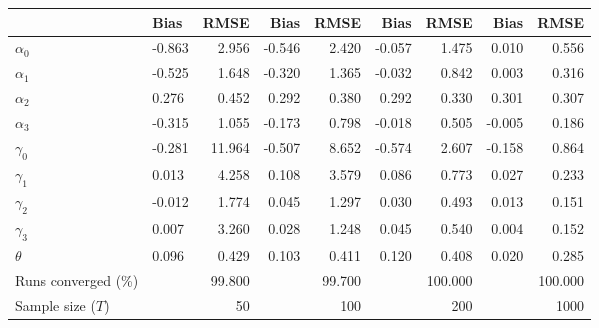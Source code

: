 
\begin{tabular}[t]{llrrrrrrr}
\toprule
  & Bias & RMSE & Bias & RMSE & Bias & RMSE & Bias & RMSE\\
\midrule
$\alpha_{0}$ & -0.863 & 2.956 & -0.546 & 2.420 & -0.057 & 1.475 & 0.010 & 0.556\\
$\alpha_{1}$ & -0.525 & 1.648 & -0.320 & 1.365 & -0.032 & 0.842 & 0.003 & 0.316\\
$\alpha_{2}$ & 0.276 & 0.452 & 0.292 & 0.380 & 0.292 & 0.330 & 0.301 & 0.307\\
$\alpha_{3}$ & -0.315 & 1.055 & -0.173 & 0.798 & -0.018 & 0.505 & -0.005 & 0.186\\
$\gamma_{0}$ & -0.281 & 11.964 & -0.507 & 8.652 & -0.574 & 2.607 & -0.158 & 0.864\\
$\gamma_{1}$ & 0.013 & 4.258 & 0.108 & 3.579 & 0.086 & 0.773 & 0.027 & 0.233\\
$\gamma_{2}$ & -0.012 & 1.774 & 0.045 & 1.297 & 0.030 & 0.493 & 0.013 & 0.151\\
$\gamma_{3}$ & 0.007 & 3.260 & 0.028 & 1.248 & 0.045 & 0.540 & 0.004 & 0.152\\
$\theta$ & 0.096 & 0.429 & 0.103 & 0.411 & 0.120 & 0.408 & 0.020 & 0.285\\
Runs converged (\%) &  & 99.800 &  & 99.700 &  & 100.000 &  & 100.000\\
Sample size ($T$) &  & 50 &  & 100 &  & 200 &  & 1000\\
\bottomrule
\end{tabular}
